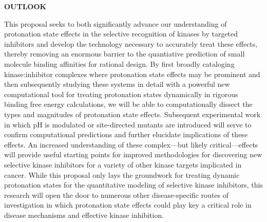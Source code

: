 \documentclass[11pt]{article}
\begin{document}
{{{\bf OUTLOOK}

This proposal seeks to both significantly advance our understanding of protonation state effects in the selective recognition of kinases by targeted inhibitors and develop the technology necessary to accurately treat these effects, thereby removing an enormous barrier to the quantiative prediction of small molecule binding affinities for rational design.
By first broadly cataloging kinase:inhibitor complexes where protonation state effects may be prominent and then subsequently studying these systems in detail with a powerful new computational tool for treating protonation states dynamically in rigorous binding free energy calculations, we will be able to computationally dissect the types and magnitudes of protonation state effects.
Subsequent experimental work in which pH is modulated or site-directed mutants are introduced will serve to confirm computational predictions and further elucidate implications of these effects.
An increased understanding of these complex---but likely critical---effects will provide useful starting points for improved methodologies for discovering new selective kinase inhibitors for a variety of other kinase targets implicated in cancer.
While this proposal only lays the groundwork for treating dynamic protonation states for the quantitative modeling of selective kinase inhibitors, this research will open the door to numerous other disease-specific routes of investigation in which protonation state effects could play key a critical role in disease mechanisms and effective kinase inhibition.



}}
\end{document}
